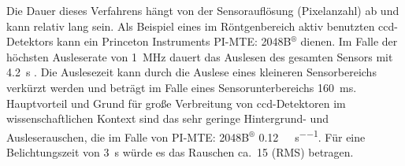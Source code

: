 \noindent
Die Dauer dieses Verfahrens hängt von der Sensorauflösung (Pixelanzahl) ab und kann relativ lang sein. Als Beispiel eines im Röntgenbereich aktiv benutzten \gls{ccd}-Detektors kann ein Princeton Instruments PI-MTE: 2048B$^{\text{®}}$ dienen. Im Falle der höchsten Ausleserate von \SI{1}{\mega\hertz} dauert das Auslesen des gesamten Sensors mit  \SI{4,2}{\second} \cite[s. 81, Readout-Charakterstik]{mte-manual}. Die Auslesezeit kann  durch die Auslese eines kleineren Sensorbereichs verkürzt werden und beträgt im Falle eines  Sensorunterbereichs \SI{160}{\milli\second}. Hauptvorteil und Grund für große Verbreitung von \gls{ccd}-Detektoren im wissenschaftlichen Kontext sind das sehr geringe Hintergrund- und Ausleserauschen, die im Falle von PI-MTE: 2048B$^{\text{®}}$ \SI[per-mode=symbol]{0.12}{\electron\per\pixel\per\second}. Für eine Belichtungszeit von \SI{3}{\second} würde es das Rauschen ca.\ \SI{15}{\electron} (RMS) betragen.

